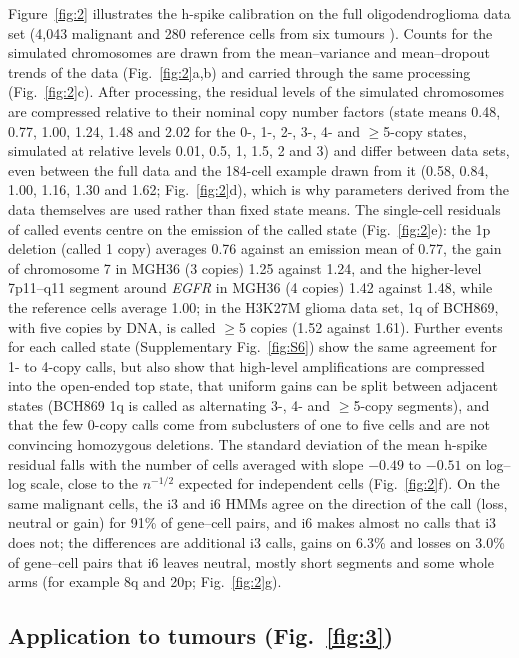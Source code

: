 Figure~\ref{fig:2} illustrates the h-spike calibration on the full oligodendroglioma data set (4,043 malignant and 280 reference cells from six tumours \citep{tirosh2016oligo}). Counts for the simulated chromosomes are drawn from the mean--variance and mean--dropout trends of the data (Fig.~\ref{fig:2}a,b) and carried through the same processing (Fig.~\ref{fig:2}c). After processing, the residual levels of the simulated chromosomes are compressed relative to their nominal copy number factors (state means 0.48, 0.77, 1.00, 1.24, 1.48 and 2.02 for the 0-, 1-, 2-, 3-, 4- and $\geq$5-copy states, simulated at relative levels 0.01, 0.5, 1, 1.5, 2 and 3) and differ between data sets, even between the full data and the 184-cell example drawn from it (0.58, 0.84, 1.00, 1.16, 1.30 and 1.62; Fig.~\ref{fig:2}d), which is why parameters derived from the data themselves are used rather than fixed state means. The single-cell residuals of called events centre on the emission of the called state (Fig.~\ref{fig:2}e): the 1p deletion (called 1 copy) averages 0.76 against an emission mean of 0.77, the gain of chromosome 7 in MGH36 (3 copies) 1.25 against 1.24, and the higher-level 7p11--q11 segment around \textit{EGFR} in MGH36 (4 copies) 1.42 against 1.48, while the reference cells average 1.00; in the H3K27M glioma data set, 1q of BCH869, with five copies by DNA, is called $\geq$5 copies (1.52 against 1.61). Further events for each called state (Supplementary Fig.~\ref{fig:S6}) show the same agreement for 1- to 4-copy calls, but also show that high-level amplifications are compressed into the open-ended top state, that uniform gains can be split between adjacent states (BCH869 1q is called as alternating 3-, 4- and $\geq$5-copy segments), and that the few 0-copy calls come from subclusters of one to five cells and are not convincing homozygous deletions. The standard deviation of the mean h-spike residual falls with the number of cells averaged with slope $-0.49$ to $-0.51$ on log--log scale, close to the $n^{-1/2}$ expected for independent cells (Fig.~\ref{fig:2}f). On the same malignant cells, the i3 and i6 HMMs agree on the direction of the call (loss, neutral or gain) for 91\% of gene--cell pairs, and i6 makes almost no calls that i3 does not; the differences are additional i3 calls, gains on 6.3\% and losses on 3.0\% of gene--cell pairs that i6 leaves neutral, mostly short segments and some whole arms (for example 8q and 20p; Fig.~\ref{fig:2}g).

\subsection{Application to tumours (Fig.~\ref{fig:3})}

